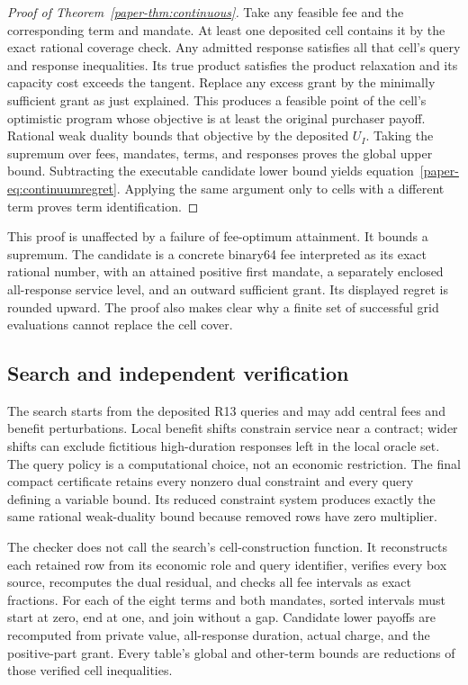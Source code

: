 \begin{proof}[Proof of Theorem~\ref{paper-thm:continuous}]
Take any feasible fee and the corresponding term and mandate. At least one deposited cell contains it by the exact rational coverage check. Any admitted response satisfies all that cell's query and response inequalities. Its true product satisfies the product relaxation and its capacity cost exceeds the tangent. Replace any excess grant by the minimally sufficient grant as just explained. This produces a feasible point of the cell's optimistic program whose objective is at least the original purchaser payoff. Rational weak duality bounds that objective by the deposited $U_I$. Taking the supremum over fees, mandates, terms, and responses proves the global upper bound. Subtracting the executable candidate lower bound yields equation~\eqref{paper-eq:continuumregret}. Applying the same argument only to cells with a different term proves term identification.
\end{proof}

This proof is unaffected by a failure of fee-optimum attainment. It bounds a supremum. The candidate is a concrete binary64 fee interpreted as its exact rational number, with an attained positive first mandate, a separately enclosed all-response service level, and an outward sufficient grant. Its displayed regret is rounded upward. The proof also makes clear why a finite set of successful grid evaluations cannot replace the cell cover.

\subsection{Search and independent verification}
The search starts from the deposited R13 queries and may add central fees and benefit perturbations. Local benefit shifts constrain service near a contract; wider shifts can exclude fictitious high-duration responses left in the local oracle set. The query policy is a computational choice, not an economic restriction. The final compact certificate retains every nonzero dual constraint and every query defining a variable bound. Its reduced constraint system produces exactly the same rational weak-duality bound because removed rows have zero multiplier.

The checker does not call the search's cell-construction function. It reconstructs each retained row from its economic role and query identifier, verifies every box source, recomputes the dual residual, and checks all fee intervals as exact fractions. For each of the eight terms and both mandates, sorted intervals must start at zero, end at one, and join without a gap. Candidate lower payoffs are recomputed from private value, all-response duration, actual charge, and the positive-part grant. Every table's global and other-term bounds are reductions of those verified cell inequalities.

